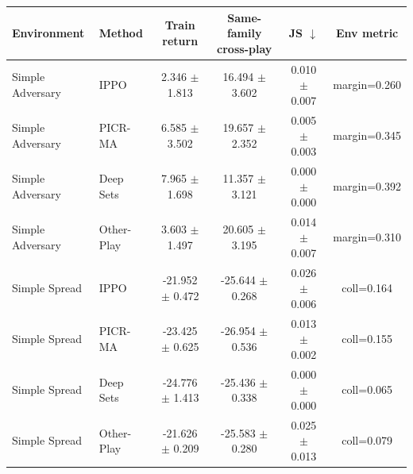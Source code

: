 \begin{tabular}{llcccc}
\toprule
Environment & Method & Train return & Same-family cross-play & JS $\downarrow$ & Env metric \\
\midrule
Simple Adversary & IPPO & 2.346 $\pm$ 1.813 & 16.494 $\pm$ 3.602 & 0.010 $\pm$ 0.007 & margin=0.260 \\
Simple Adversary & PICR-MA & 6.585 $\pm$ 3.502 & 19.657 $\pm$ 2.352 & 0.005 $\pm$ 0.003 & margin=0.345 \\
Simple Adversary & Deep Sets & 7.965 $\pm$ 1.698 & 11.357 $\pm$ 3.121 & 0.000 $\pm$ 0.000 & margin=0.392 \\
Simple Adversary & Other-Play & 3.603 $\pm$ 1.497 & 20.605 $\pm$ 3.195 & 0.014 $\pm$ 0.007 & margin=0.310 \\
\midrule
Simple Spread & IPPO & -21.952 $\pm$ 0.472 & -25.644 $\pm$ 0.268 & 0.026 $\pm$ 0.006 & coll=0.164 \\
Simple Spread & PICR-MA & -23.425 $\pm$ 0.625 & -26.954 $\pm$ 0.536 & 0.013 $\pm$ 0.002 & coll=0.155 \\
Simple Spread & Deep Sets & -24.776 $\pm$ 1.413 & -25.436 $\pm$ 0.338 & 0.000 $\pm$ 0.000 & coll=0.065 \\
Simple Spread & Other-Play & -21.626 $\pm$ 0.209 & -25.583 $\pm$ 0.280 & 0.025 $\pm$ 0.013 & coll=0.079 \\
\bottomrule
\end{tabular}
